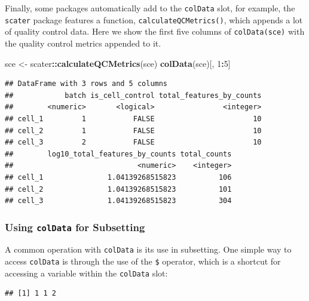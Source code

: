 \documentclass[]{book}
\newenvironment{Shaded}{\begin{snugshade}}{\end{snugshade}}
\newcommand{\DecValTok}[1]{\textcolor[rgb]{0.00,0.00,0.81}{#1}}
\newcommand{\KeywordTok}[1]{\textcolor[rgb]{0.13,0.29,0.53}{\textbf{#1}}}
\newcommand{\NormalTok}[1]{#1}
\newcommand{\OperatorTok}[1]{\textcolor[rgb]{0.81,0.36,0.00}{\textbf{#1}}}
\newcommand{\StringTok}[1]{\textcolor[rgb]{0.31,0.60,0.02}{#1}}
\begin{document}
Finally, some packages automatically add to the \texttt{colData} slot, for example, the \texttt{scater} package features a function, \texttt{calculateQCMetrics()}, which appends a lot of quality control data. Here we show the first five columns of \texttt{colData(sce)} with the quality control metrics appended to it.

\begin{Shaded}
\begin{Highlighting}[]
\NormalTok{sce <-}\StringTok{ }\NormalTok{scater}\OperatorTok{::}\KeywordTok{calculateQCMetrics}\NormalTok{(sce)}
\KeywordTok{colData}\NormalTok{(sce)[, }\DecValTok{1}\OperatorTok{:}\DecValTok{5}\NormalTok{]}
\end{Highlighting}
\end{Shaded}

\begin{verbatim}
## DataFrame with 3 rows and 5 columns
##            batch is_cell_control total_features_by_counts
##        <numeric>       <logical>                <integer>
## cell_1         1           FALSE                       10
## cell_2         1           FALSE                       10
## cell_3         2           FALSE                       10
##        log10_total_features_by_counts total_counts
##                             <numeric>    <integer>
## cell_1               1.04139268515823          106
## cell_2               1.04139268515823          101
## cell_3               1.04139268515823          304
\end{verbatim}

\hypertarget{using-coldata-for-subsetting}{%
\subsubsection{\texorpdfstring{Using \texttt{colData} for Subsetting}{Using colData for Subsetting}}\label{using-coldata-for-subsetting}}

A common operation with \texttt{colData} is its use in subsetting. One simple way to access \texttt{colData} is through the use of the \texttt{\$} operator, which is a shortcut for accessing a variable within the \texttt{colData} slot:

\begin{Shaded}
\end{Shaded}

\begin{verbatim}
## [1] 1 1 2
\end{verbatim}
\end{document}
